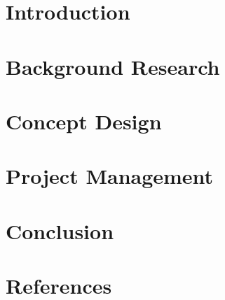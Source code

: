\documentclass[12pt,oneside,letterpaper,english]{article}
\begin{document}

    \begin{singlespace}
        
    \end{singlespace}

    \newpage
     
    
    \newpage
    \tableofcontents
    \thispagestyle{fancy}
    
    \newpage
    
    \newpage
    \section{Introduction} \label{ch1}
     
    
    \newpage
    \section{Background Research} \label{ch2}
     
    
    \newpage
    \section{Concept Design} \label{ch3}
     
    
    \newpage
    \section{Project Management} \label{ch4}
     
    
    \newpage
    \section{Conclusion} \label{ch5}
    
    
    \newpage
    \section{References} \label{ch6}
    \begingroup
        \renewcommand{\refname}{} %
        \setlength{\parskip}{0pt}
        \setlength{\itemsep}{0pt plus 0.3ex}
        \vspace{-4em}
        \nocite{*}
        \footnotesize{}
        \vspace{-1.5em}
    \endgroup
    
\end{document}
